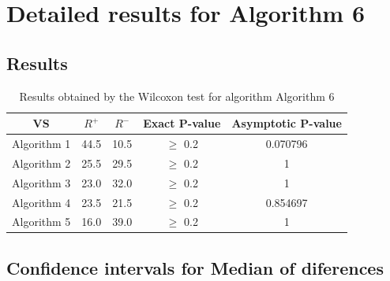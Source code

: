 \documentclass[a4paper,10pt]{article}
\begin{document}
 \clearpage 


\section{Detailed results for Algorithm 6}


\subsection{Results}

\begin{table}[!htp]
\centering\small
\begin{tabular}{
|c|c|c|c|c|}
\hline
 VS & $R^{+}$ & $R^{-}$ & Exact P-value & Asymptotic P-value \\ \hline 
Algorithm 1 & 44.5 & 10.5 & $\geq$ 0.2 & 0.070796\\ \hline 
Algorithm 2 & 25.5 & 29.5 & $\geq$ 0.2 & 1\\ \hline 
Algorithm 3 & 23.0 & 32.0 & $\geq$ 0.2 & 1\\ \hline 
Algorithm 4 & 23.5 & 21.5 & $\geq$ 0.2 & 0.854697\\ \hline 
Algorithm 5 & 16.0 & 39.0 & $\geq$ 0.2 & 1\\ \hline 

\end{tabular}
\caption{Results obtained by the Wilcoxon test for algorithm Algorithm 6}
\end{table}

\subsection{Confidence intervals for Median of diferences}
\end{document}
